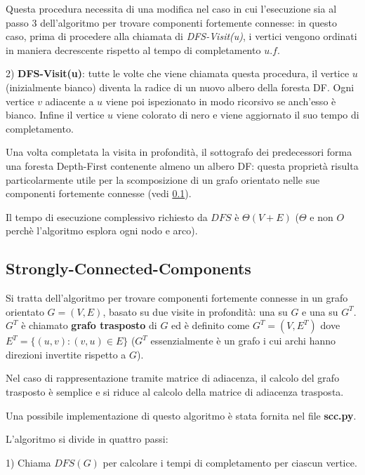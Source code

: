 \documentclass[a4paper,12pt]{article}
\begin{document}
Questa procedura necessita di una modifica nel caso in cui l'esecuzione sia al passo 3 dell'algoritmo per trovare componenti fortemente connesse: in questo caso, prima di procedere alla chiamata di \textit{DFS-Visit(u)}, i vertici vengono ordinati in maniera decrescente rispetto al tempo di completamento $u.f$.
\newline

2) \textbf{DFS-Visit(u)}: tutte le volte che viene chiamata questa procedura, il vertice $u$ (inizialmente bianco) diventa la radice di un nuovo albero della foresta DF. Ogni vertice $v$ adiacente a $u$ viene poi ispezionato in modo ricorsivo se anch'esso è bianco. Infine il vertice $u$ viene colorato di nero e viene aggiornato il suo tempo di completamento.
\newline

Una volta completata la visita in profondità, il sottografo dei predecessori forma una foresta Depth-First contenente almeno un albero DF: questa proprietà risulta particolarmente utile per la scomposizione di un grafo orientato nelle sue componenti fortemente connesse (vedi \ref{ssec:scc}).
\newline

Il tempo di esecuzione complessivo richiesto da $DFS$ è $\Theta(V +E)$ ($\Theta$ e non $O$ perchè l'algoritmo esplora ogni nodo e arco).

\subsection{Strongly-Connected-Components} \label{ssec:scc}
Si tratta dell'algoritmo per trovare componenti fortemente connesse in un grafo orientato $G = (V, E)$, basato su due visite in profondità: una su $G$ e una su $G^T$. $G^T$ è chiamato \textbf{grafo trasposto} di $G$ ed è definito come $G^T = (V, E^T)$ dove $E^T = \{(u, v) : (v, u) \in E\}$ ($G^T$ essenzialmente è un grafo i cui archi hanno direzioni invertite rispetto a $G$).

Nel caso di rappresentazione tramite matrice di adiacenza, il calcolo del grafo trasposto è semplice e si riduce al calcolo della matrice di adiacenza trasposta.

Una possibile implementazione di questo algoritmo è stata fornita nel file \textbf{scc.py}.

L'algoritmo si divide in quattro passi:
\newline

1) Chiama $DFS(G)$ per calcolare i tempi di completamento per ciascun vertice.
\end{document}
